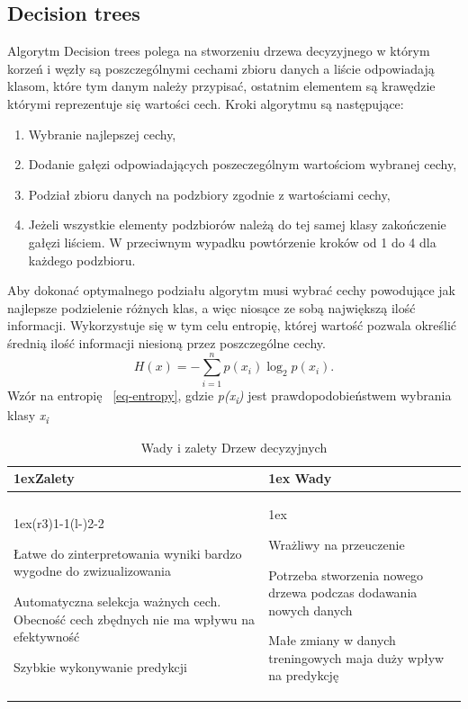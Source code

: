\subsection{Decision trees}

Algorytm Decision trees polega na stworzeniu drzewa decyzyjnego w którym korzeń i węzły
są poszczególnymi cechami zbioru danych a liście odpowiadają klasom, które tym danym 
należy przypisać, ostatnim elementem są krawędzie którymi reprezentuje się wartości cech. 
Kroki algorytmu są następujące:
\begin{enumerate}
    \item Wybranie najlepszej cechy,
    \item Dodanie gałęzi odpowiadających poszeczególnym wartościom wybranej cechy,
    \item Podział zbioru danych na podzbiory zgodnie z wartościami cechy,
    \item Jeżeli wszystkie elementy podzbiorów należą do tej samej klasy 
    zakończenie gałęzi liściem. W przeciwnym wypadku powtórzenie kroków 
    od 1 do 4 dla każdego podzbioru.
\end{enumerate}
Aby dokonać optymalnego podziału algorytm musi wybrać cechy powodujące jak najlepsze
podzielenie różnych klas, a więc niosące ze sobą największą ilość informacji.
Wykorzystuje się w tym celu entropię, której wartość pozwala określić średnią ilość 
informacji niesioną przez poszczególne cechy.
\begin{equation}
    H(x)=-\sum_{i=1}^n p(x_i) \log_2 p(x_i).
    \label{eq-entropy}
\end{equation}
Wzór na entropię ~\ref{eq-entropy}, gdzie \textit{p(x\textsubscript{i})} jest prawdopodobieństwem
wybrania klasy \textit{x\textsubscript{i}}
\begin{table}[h]
    \begin{tabularx}{\linewidth}{>{\parskip1ex}X@{\kern4\tabcolsep}>{\parskip1ex}X}
    \toprule
    \hfil\bfseries Zalety
    &
    \hfil\bfseries Wady
    \\\cmidrule(r{3\tabcolsep}){1-1}\cmidrule(l{-\tabcolsep}){2-2}
    
    Łatwe do zinterpretowania wyniki bardzo wygodne do zwizualizowania\par
    Automatyczna selekcja ważnych cech. Obecność cech zbędnych nie ma wpływu na efektywność\par
    Szybkie wykonywanie predykcji\par
    &
    
    Wrażliwy na przeuczenie\par
    Potrzeba stworzenia nowego drzewa podczas dodawania nowych danych\par
    Małe zmiany w danych treningowych maja duży wpływ na predykcję\par
    
    \\\bottomrule
    \end{tabularx}
    \caption{Wady i zalety Drzew decyzyjnych}
\end{table}

